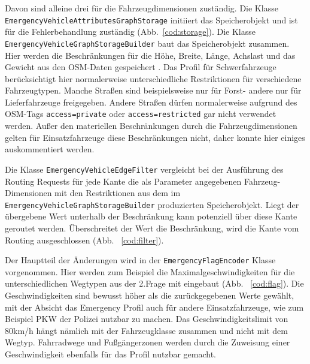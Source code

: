 Davon sind alleine drei für die Fahrzeugdimensionen zuständig.
Die Klasse \texttt{EmergencyVehicleAttributesGraphStorage} initiiert das Speicherobjekt und ist für die Fehlerbehandlung zuständig (Abb.~\ref{cod:storage}).
Die Klasse \texttt{EmergencyVehicleGraphStorageBuilder} baut das Speicherobjekt zusammen.
Hier werden die Beschränkungen für die Höhe, Breite, Länge, Achslast und das Gewicht aus den OSM-Daten gespeichert .
Das Profil für Schwerfahrzeuge berücksichtigt hier normalerweise unterschiedliche Restriktionen für verschiedene Fahrzeugtypen.
Manche Straßen sind beispielsweise nur für Forst- andere nur für Lieferfahrzeuge freigegeben.
Andere Straßen dürfen normalerweise aufgrund des OSM-Tags \texttt{access=private} oder \texttt{access=restricted} gar nicht verwendet werden.
Außer den materiellen Beschränkungen durch die Fahrzeugdimensionen gelten für Einsatzfahrzeuge diese Beschränkungen nicht, daher konnte hier einiges auskommentiert werden.

% 

Die Klasse \texttt{EmergencyVehicleEdgeFilter} vergleicht bei der Ausführung des Routing Requests für jede Kante die als Parameter angegebenen Fahrzeug-Dimensionen mit den Restriktionen aus dem im \texttt{EmergencyVehicleGraphStorageBuilder} produzierten Speicherobjekt.
Liegt der übergebene Wert unterhalb der Beschränkung kann potenziell über diese Kante geroutet werden.
Überschreitet der Wert die Beschränkung, wird die Kante vom Routing ausgeschlossen (Abb. ~\ref{cod:filter}).

% 

Der Hauptteil der Änderungen wird in der \texttt{EmergencyFlagEncoder} Klasse vorgenommen.
Hier werden zum Beispiel die Maximalgeschwindigkeiten für die unterschiedlichen Wegtypen aus der 2.Frage mit eingebaut (Abb. ~\ref{cod:flag}).
Die Geschwindigkeiten sind bewusst höher als die zurückgegebenen Werte gewählt, mit der Absicht das Emergency Profil auch für andere Einsatzfahrzeuge, wie zum Beispiel PKW der Polizei nutzbar zu machen.
Das Geschwindigkeitslimit von 80km/h hängt nämlich mit der Fahrzeugklasse zusammen und nicht mit dem Wegtyp.
Fahrradwege und Fußgängerzonen werden durch die Zuweisung einer Geschwindigkeit ebenfalls für das Profil nutzbar gemacht.

